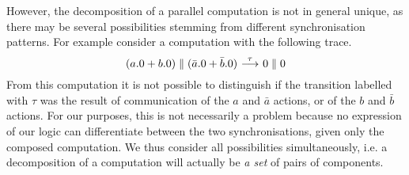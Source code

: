 %
However, the decomposition of a parallel computation 
is not in general unique, as there may be several possibilities
stemming from different synchronisation patterns.
For example consider a computation with the following trace.
\[
     (a.0+b.0)\parallel(\bar{a}.0+\bar{b}.0) \ {\stackrel{{\tau}}{\longrightarrow}}\  0\parallel 0
\]
From this computation it is not possible to distinguish if the transition
labelled with $\tau$ was the result of communication of the $a$ and $\bar a$ actions,
or of the $b$ and $\bar b$ actions.
For our purposes, this is not necessarily a problem because no expression
of our logic can differentiate between the two synchronisations, given only the composed
computation. We thus consider all possibilities simultaneously,
i.e. a decomposition of a computation will actually
be \emph{a set} of pairs of components.

